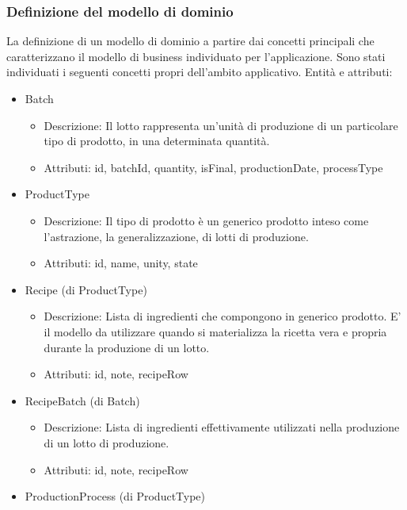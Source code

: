 \documentclass[a4paper,11pt]{article}
\begin{document}
\subsubsection{Definizione del modello di dominio}\label{modellodominio}

La definizione di un modello di dominio a partire dai concetti principali che caratterizzano il modello di business individuato per l'applicazione.
Sono stati individuati i seguenti concetti propri dell'ambito applicativo.
Entità e attributi:

\begin{itemize}
  \item Batch
        \begin{itemize}
          \item Descrizione: Il lotto rappresenta un'unità di produzione di un particolare tipo di prodotto, in una determinata quantità.
          \item Attributi: id, batchId, quantity, isFinal, productionDate, processType
        \end{itemize}
  \item ProductType
        \begin{itemize}
          \item Descrizione: Il tipo di prodotto è un generico prodotto inteso come l'astrazione, la generalizzazione, di lotti di produzione.
          \item Attributi: id, name, unity, state
        \end{itemize}
  \item Recipe (di ProductType)
        \begin{itemize}
          \item Descrizione: Lista di ingredienti che compongono in generico prodotto. E' il modello da utilizzare quando si materializza la ricetta vera e propria durante la produzione di un lotto.
          \item Attributi: id, note, recipeRow
        \end{itemize}
  \item RecipeBatch (di Batch)
        \begin{itemize}
          \item Descrizione: Lista di ingredienti effettivamente utilizzati nella produzione di un lotto di produzione.
          \item Attributi: id, note, recipeRow
        \end{itemize}
  \item ProductionProcess (di ProductType)

\end{itemize}
\end{document}
